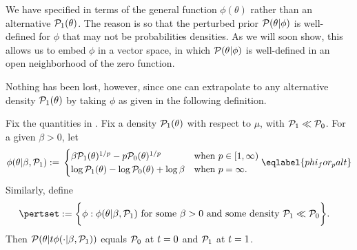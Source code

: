 We have specified  in terms of the general function
$\phi(\theta)$ rather than an alternative $\mathcal{P}_{1}(\theta)$.  The reason is so
that the perturbed prior $\mathcal{P}(\theta \vert \phi)$ is well-defined for $\phi$ that
may not be probabilities densities.  As we will soon show, this allows us to
embed $\phi$ in a vector space, in which $\mathcal{P}(\theta \vert \phi)$ is well-defined
in an open neighborhood of the zero function.

Nothing has been lost, however, since one can extrapolate to any alternative
density $\mathcal{P}_{1}(\theta)$ by taking $\phi$ as given in the following definition.


\begin{defn}
%
Fix the quantities in .  Fix a density $\mathcal{P}_{1}(\theta)$
with respect to $\mu$, with $\mathcal{P}_{1} \ll \mathcal{P}_{0}$. For a given $\beta > 0$, let
%
\begin{align}
%
\phi(\theta | \beta, \palt) :={}
\begin{cases}
\beta \palt(\theta)^{1/p} - p \pbase(\theta)^{1/p}
    & \textrm{when }p \in [1, \infty) \\
\log \palt(\theta) - \log \pbase(\theta) + \log \beta
    & \textrm{when }p = \infty.
\end{cases} \eqlabel{phi_for_palt}
%
\end{align}
%
Similarly, define
%
\begin{align*}
%
\pertset := \bigg\{&
    \phi:  \phi(\theta | \beta, \palt) %
    \textrm{ for some }\beta > 0\textrm{ and some density }\palt \ll \pbase
\bigg\}.
%
\end{align*}
%
Then $\mathcal{P}(\theta \vert t \phi(\cdot \vert \beta, \mathcal{P}_{1}))$ equals $\mathcal{P}_{0}$
at $t = 0$ and $\mathcal{P}_{1}$ at $t = 1$.
%
\end{defn}


